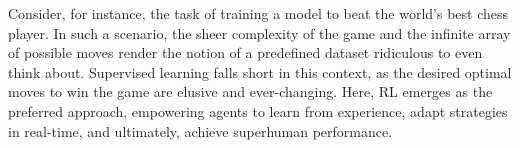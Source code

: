 \documentclass{article}
\begin{document}
Consider, for instance, the task of training a model to beat the world's best chess player. In such a scenario, the sheer complexity of the game and the infinite array of possible moves render the notion of a predefined dataset ridiculous to even think about. Supervised learning falls short in this context, as the desired optimal moves to win the game are elusive and ever-changing. Here, RL emerges as the preferred approach, empowering agents to learn from experience, adapt strategies in real-time, and ultimately, achieve superhuman performance.




{\footnotesize
  
}
% 



%
%
%
\end{document}
